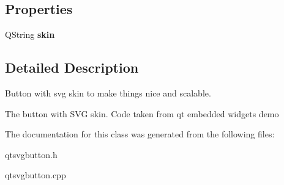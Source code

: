 \subsection*{Properties}
\begin{CompactItemize}
\item 
\hypertarget{classQtSvgButton_91c027d79fa7de0708dc991999031398}{
QString \textbf{skin}}
\label{classQtSvgButton_91c027d79fa7de0708dc991999031398}

\end{CompactItemize}


\subsection{Detailed Description}
Button with svg skin to make things nice and scalable. 

The button with SVG skin. Code taken from qt embedded widgets demo 

The documentation for this class was generated from the following files:\begin{CompactItemize}
\item 
qtsvgbutton.h\item 
qtsvgbutton.cpp\end{CompactItemize}

